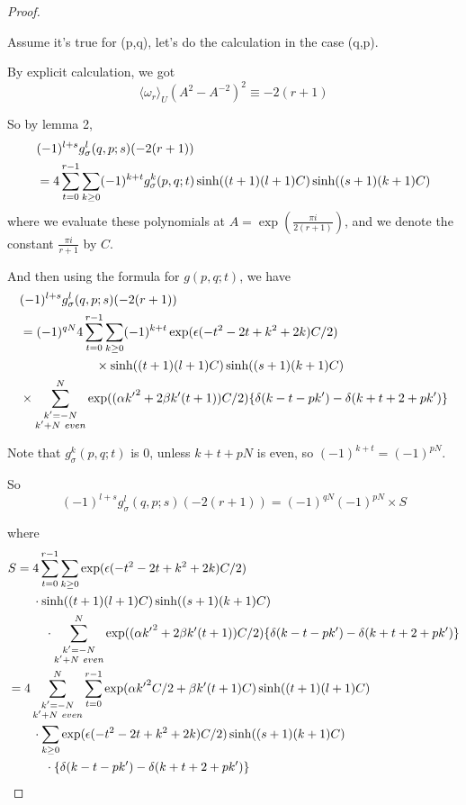 \label{proof}



\begin{proof}
\

Assume it's true for (p,q), let's do the calculation in the case (q,p).

By explicit calculation, we got
\[\langle\omega_r\rangle_U(A^2-A^{-2})^2\equiv -2(r+1)\]

So by lemma 2,
\begin{align} &(-1)^{l+s}g_\sigma^l(q,p;s)(-2(r+1))\notag\\
&= 4\sum_{t=0}^{r-1}\sum_{k\ge 0} (-1)^{k+t}g_{\sigma}^k(p,q;t)\sinh((t+1)(l+1)C)\sinh((s+1)(k+1)C)\notag\end{align}
 where we evaluate these polynomials at $A=\exp(\frac{\pi i}{2(r+1)})$, and we denote the constant $\frac{\pi i}{r+1}$ by $C$.

And then using the formula for $g(p,q;t)$, we have
\begin{align} &(-1)^{l+s}g_\sigma^l(q,p;s)(-2(r+1))\notag\\
&= (-1)^{qN}4\sum_{t=0}^{r-1}\sum_{k\ge 0}
(-1)^{k+t} \exp(\epsilon(-t^2-2t+k^2+2k)C/2)\notag\\
&\qquad\qquad\qquad\times\sinh((t+1)(l+1)C)\sinh((s+1)(k+1)C)\notag\\
&\times\sum_{ \substack {k'=-N\\ k'+N\ even}}^N \exp((\alpha {k'}^2+2\beta k'
(t+1))C/2)\{\delta(k-t-pk')-\delta(k+t+2+pk')\}\notag\end{align}

Note that $g_{\sigma}^k(p,q;t)$ is 0, unless $k+t+pN$ is even, so $(-1)^{k+t}=(-1)^{pN}$.

So
\[(-1)^{l+s}g_\sigma^l(q,p;s)(-2(r+1))=(-1)^{qN}(-1)^{pN}\times S \tag{A}\]

where
\begin{align} &S=4\sum_{t=0}^{r-1}\sum_{k\ge 0} \exp(\epsilon(-t^2-2t+k^2+2k)C/2)\notag\\
&\qquad\cdot\sinh((t+1)(l+1)C)\sinh((s+1)(k+1)C)\notag\\
&\qquad\quad\cdot\sum_{ \substack {k'=-N\\ k'+N\ even}}^N \exp((\alpha {k'}^2+2\beta k'
(t+1))C/2)\{\delta(k-t-pk')-\delta(k+t+2+pk')\}\notag\\
&=4\sum_{ \substack {k'=-N\\ k'+N\ even}}^N \sum_{t=0}^{r-1}\exp(\alpha {k^\prime}^2C/2+\beta
k^\prime(t+1)C)\sinh((t+1)(l+1)C)\notag\\
&\qquad\cdot \sum_{k\ge 0}
\exp(\epsilon(-t^2-2t+k^2+2k)C/2)\sinh((s+1)(k+1)C)\notag\\
&\qquad\quad\cdot\{\delta(k-t-pk')-\delta(k+t+2+pk')\}\notag\end{align}


\end{proof}
